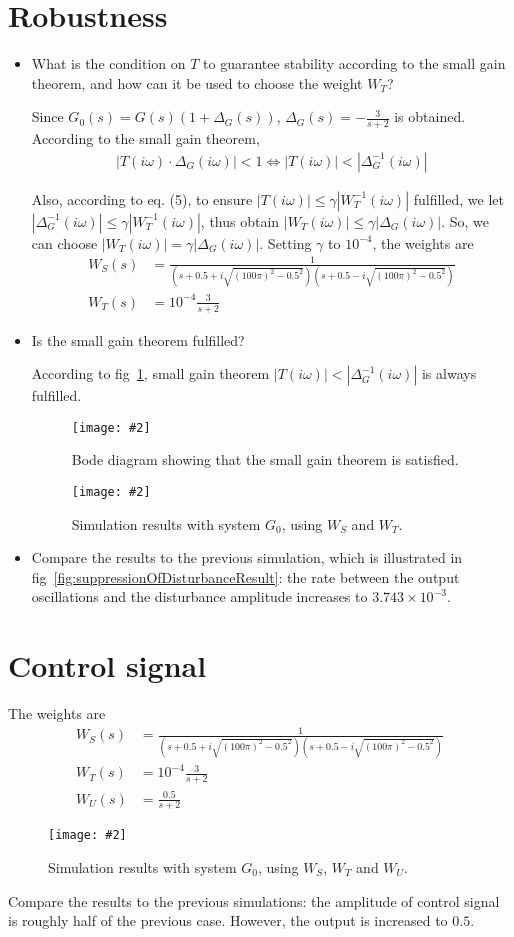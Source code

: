 \documentclass[11pt,a4paper]{article}
\newcommand{\image}[3]{
	\begin{figure}[!ht]
		\centering
	    \texttt{[image: \#2]}
		\caption{#3}
		\label{fig:#2}
	\end{figure}
}
\begin{document}
\section*{Robustness}
	\begin{itemize}
		\item What is the condition on $T$ to guarantee stability according to the small gain theorem, and how can it be used to choose the weight $W_T$?
		\par Since $G_{0}(s) = G(s)(1 + \Delta_{G}(s))$, $\Delta_{G}(s) = -\frac{3}{s+2}$ is obtained. According to the small gain theorem,
			\begin{align*}
				|T(i\omega)\cdot\Delta_{G}(i\omega)| < 1 \Leftrightarrow |T(i\omega)| < |\Delta^{-1}_{G}(i\omega)|
			\end{align*}
		\par Also, according to eq. (5), to ensure $|T(i\omega)| \leq \gamma |W^{-1}_{T}(i\omega)|$ fulfilled, we let $|\Delta^{-1}_{G}(i\omega)| \leq \gamma |W^{-1}_{T}(i\omega)|$, thus obtain $ |W_{T}(i\omega)| \leq \gamma |\Delta_{G}(i\omega)| $. So, we can choose $ |W_{T}(i\omega)| = \gamma |\Delta_{G}(i\omega)| $. Setting $\gamma$ to $10^{-4}$, the weights are
			\begin{align*}
				W_S(s) &= \frac{1}{(s+0.5+i\sqrt{(100\pi)^{2}-0.5^{2}})(s+0.5-i\sqrt{(100\pi)^{2}-0.5^{2}})} \\
				W_T(s) &= 10^{-4}\frac{3}{s + 2}
			\end{align*}
			
		\item Is the small gain theorem fulfilled?
		\par According to fig~\ref{fig:robustnessBode}, small gain theorem $|T(i\omega)| < |\Delta^{-1}_{G}(i\omega)|$ is always fulfilled.
			\image{0.75}{robustnessBode}{Bode diagram showing that the small gain theorem is satisfied.}
			\image{0.75}{robustnessResult}{Simulation results with system $G_0$, using $W_S$ and $W_T$.}
		
		\item Compare the results to the previous simulation, which is illustrated in fig~\ref{fig:suppressionOfDisturbanceResult}: the rate between the output oscillations and the disturbance amplitude increases to $3.743\times 10^{-3}$.
	\end{itemize}


\section*{Control signal}
\par The weights are
	\begin{align*}
		W_S(s) &= \frac{1}{(s+0.5+i\sqrt{(100\pi)^{2}-0.5^{2}})(s+0.5-i\sqrt{(100\pi)^{2}-0.5^{2}})} \\
		W_T(s) &= 10^{-4}\frac{3}{s + 2} \\
		W_U(s) &= \frac{0.5}{s + 2}
	\end{align*}

	\image{1}{controlSignalResult}{Simulation results with system $G_0$, using $W_S$, $W_T$ and $W_U$.}

\par Compare the results to the previous simulations: the amplitude of control signal is roughly half of the previous case. However, the output is increased to $0.5$.
\end{document}

